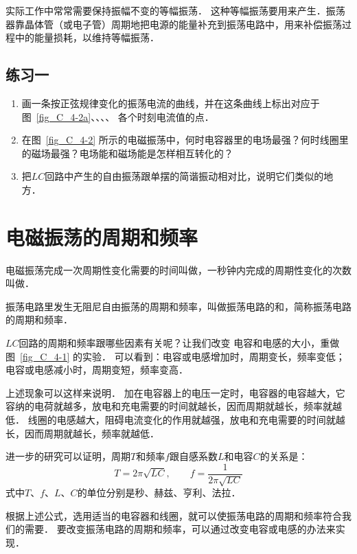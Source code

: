 实际工作中常常需要保持振幅不变的等幅振荡．
这种等幅振荡要用来产生．振荡器靠晶体管（或电子管）周期地把电源的能量补充到振荡电路中，用来补偿振荡过程中的能量损耗，以维持等幅振荡．

\subsection*{练习一}
\begin{enumerate}
    \item 画一条按正弦规律变化的振荡电流的曲线，并在这条曲线上标出对应于图~\ref{fig_C_4-2a}、、、、 各个时刻电流值的点．
    \item 在图~\ref{fig_C_4-2} 所示的电磁振荡中，何时电容器里的电场最强？何时线圈里的磁场最强？电场能和磁场能是怎样相互转化的？
    \item 把$LC$回路中产生的自由振荡跟单摆的简谐振动相对比，说明它们类似的地方．
\end{enumerate}


\section{电磁振荡的周期和频率}
电磁振荡完成一次周期性变化需要的时间叫做，一秒钟内完成的周期性变化的次数叫做．

振荡电路里发生无阻尼自由振荡的周期和频率，叫做振荡电路的和，简称振荡电路的周期和频率．

$LC$回路的周期和频率跟哪些因素有关呢？让我们改变
电容和电感的大小，重做图~\ref{fig_C_4-1} 的实验．
可以看到：电容或电感增加时，周期变长，频率变低；电容或电感减小时，周期变短，频率变高．

上述现象可以这样来说明．
加在电容器上的电压一定时，电容器的电容越大，它容纳的电荷就越多，放电和充电需要的时间就越长，因而周期就越长，频率就越低．
线圈的电感越大，阻碍电流变化的作用就越强，放电和充电需要的时间就越长，因而周期就越长，频率就越低．

进一步的研究可以证明，周期$T$和频率$f$跟自感系数$L$和电容$C$的关系是：
\[T=2\pi\sqrt{LC},\qquad f=\frac{1}{2\pi\sqrt{LC}} \]
式中$T$、$f$、$L$、$C$的单位分别是秒、赫兹、亨利、法拉．

根据上述公式，选用适当的电容器和线圈，就可以使振荡电路的周期和频率符合我们的需要．
要改变振荡电路的周期和频率，可以通过改变电容或电感的办法来实现．

